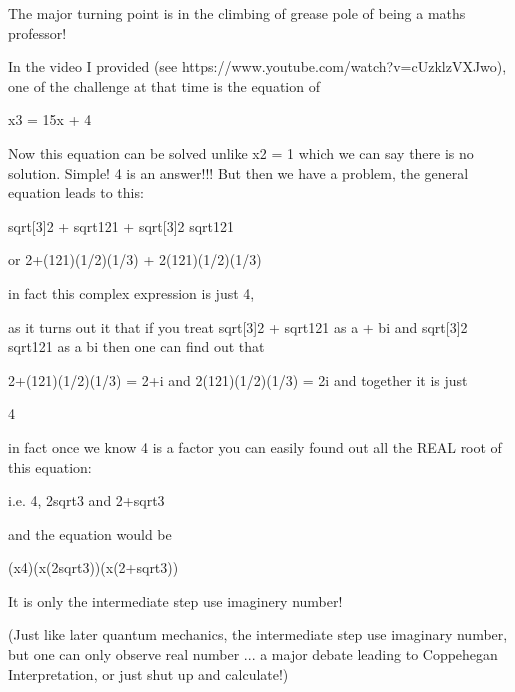 \documentclass[letterpaper,10pt,english]{jupyterBook}
\begin{document}
\begin{sphinxVerbatim}[commandchars=\\\{\}]
The major turning point is in the climbing of grease pole of being a maths professor!

In the video I provided (see https://www.youtube.com/watch?v=cUzklzVXJwo), one of the challenge
at that time is the equation of 

\PYGZdl{}\PYGZdl{}
    \PYGZob{}x\PYGZca{}3\PYGZcb{} = 15x + 4
\PYGZdl{}\PYGZdl{}

Now this equation can be solved unlike \PYGZdl{}x\PYGZca{}\PYGZob{}2\PYGZcb{} = \PYGZhy{}1\PYGZdl{} which we can say there is no solution.  
Simple! 4 is an answer!!! But then we have a problem, the general equation leads to this:

\PYGZdl{}\PYGZdl{}
    \PYGZbs{}sqrt[3]\PYGZob{}2 + \PYGZbs{}sqrt\PYGZob{}\PYGZhy{}121\PYGZcb{}\PYGZcb{} + \PYGZbs{}sqrt[3]\PYGZob{}2 \PYGZhy{} \PYGZbs{}sqrt\PYGZob{}\PYGZhy{}121\PYGZcb{}\PYGZcb{}
\PYGZdl{}\PYGZdl{}

or \PYGZob{}2+(\PYGZhy{}121)\PYGZca{}(1/2)\PYGZcb{}\PYGZca{}(1/3) + \PYGZob{}2\PYGZhy{}(\PYGZhy{}121)\PYGZca{}(1/2)\PYGZcb{}\PYGZca{}(1/3) 

in fact this complex expression is just 4, 

    as it turns out it that if you treat \PYGZbs{}sqrt[3]\PYGZob{}2 + \PYGZbs{}sqrt\PYGZob{}\PYGZhy{}121\PYGZcb{}\PYGZcb{}  as a + bi
    and \PYGZbs{}sqrt[3]\PYGZob{}2 \PYGZhy{} \PYGZbs{}sqrt\PYGZob{}\PYGZhy{}121\PYGZcb{}\PYGZcb{} as a \PYGZhy{} bi then one can find out that 

    \PYGZob{}2+(\PYGZhy{}121)\PYGZca{}(1/2)\PYGZcb{}\PYGZca{}(1/3) = 2+i and
    \PYGZob{}2\PYGZhy{}(\PYGZhy{}121)\PYGZca{}(1/2)\PYGZcb{}\PYGZca{}(1/3) = 2\PYGZhy{}i and together it is just 

    4

in fact once we know 4 is a factor you can easily found out all the REAL root of this equation:

i.e. 4, 
    \PYGZdl{}\PYGZhy{}2\PYGZhy{}\PYGZbs{}sqrt\PYGZob{}3\PYGZcb{}\PYGZdl{} and 
    \PYGZdl{}\PYGZhy{}2+\PYGZbs{}sqrt\PYGZob{}3\PYGZcb{}\PYGZdl{} 
    
and the equation would be 

\PYGZdl{}\PYGZdl{}
    (x\PYGZhy{}4)(x\PYGZhy{}(\PYGZhy{}2\PYGZhy{}\PYGZbs{}sqrt\PYGZob{}3\PYGZcb{}))(x\PYGZhy{}(\PYGZhy{}2+\PYGZbs{}sqrt\PYGZob{}3\PYGZcb{}))
\PYGZdl{}\PYGZdl{}

It is only the intermediate step use imaginery number!  

(Just like later quantum mechanics, the intermediate step use imaginary number, 
    but one can only observe real number ... a major debate leading to Coppehegan Interpretation,
    or just shut up and calculate!)
\end{sphinxVerbatim}
\end{document}
